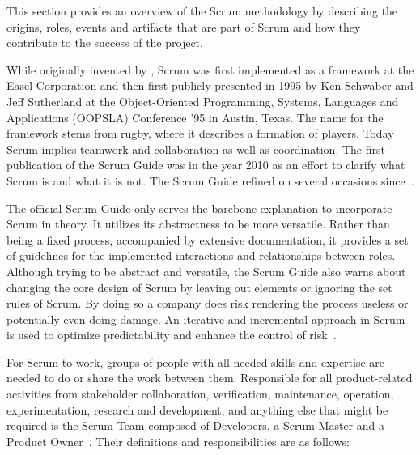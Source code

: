 This section provides an overview of the Scrum \gls{methodology} by describing the origins, roles, events and artifacts that are part of Scrum and how they contribute to the success of the project.

While originally invented by , Scrum was first implemented as a \gls{framework} at the Easel Corporation and then first publicly presented in 1995 by Ken Schwaber and Jeff Sutherland at the Object-Oriented Programming, Systems, Languages and Applications (OOPSLA) Conference '95 in Austin, Texas. The name for the \gls{framework} stems from rugby, where it describes a formation of players. Today Scrum implies teamwork and collaboration as well as coordination. The first publication of the Scrum Guide was in the year 2010 as an effort to clarify what Scrum is and what it is not. The Scrum Guide refined on several occasions since~\cite{Kneafsey2015ASH}.

The official Scrum Guide only serves the barebone explanation to incorporate Scrum in theory. It utilizes its abstractness to be more versatile. Rather than being a fixed process, accompanied by extensive documentation, it provides a set of \glspl{guideline} for the implemented interactions and relationships between roles.
Although trying to be abstract and versatile, the Scrum Guide also warns about changing the core design of Scrum by leaving out elements or ignoring the set rules of Scrum. By doing so a company does risk rendering the process useless or potentially even doing damage. An iterative and incremental approach in Scrum is used to optimize predictability and enhance the control of risk~\cite{Schwaber2020Tsg}.

For Scrum to work, groups of people with all needed skills and expertise are needed to do or share the work between them. Responsible for all product-related activities from stakeholder collaboration, verification, maintenance, operation, experimentation, research and development, and anything else that might be required is the Scrum Team composed of Developers, a Scrum Master and a Product Owner~\cite[p.~5]{Schwaber2020Tsg}. Their definitions and responsibilities are as follows:

